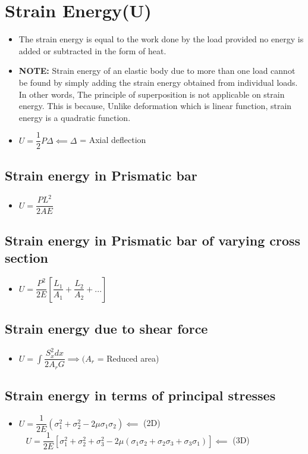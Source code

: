\documentclass[8pt]{report}
\begin{document}
	\section{Strain Energy(U)}
		\begin{itemize}
			\item The strain energy is equal to the work done by the load provided no energy is added or subtracted in the form of heat.
			\item \textbf{NOTE: } Strain energy of an elastic body due to more than one load cannot be found by simply adding the strain energy obtained from individual loads. In other words, The principle of superposition is not applicable on strain energy. This is because, Unlike deformation which is linear function, strain energy is a quadratic function. 
			\item $\boxed{U = \dfrac{1}{2}P\Delta} \impliedby \Delta$ = Axial deflection 
		\end{itemize}\hrulefill
		\subsection{Strain energy in Prismatic bar}
			\begin{itemize}
				\item $\boxed{U = \dfrac{PL^2}{2AE}}$
			\end{itemize}\hrulefill
		\subsection{Strain energy in Prismatic bar of varying cross section}
			\begin{itemize}
				\item $\boxed{U = \dfrac{P^2}{2E}\left[\dfrac{L_1}{A_1}+\dfrac{L_2}{A_2}+...\right]}$
			\end{itemize}\hrulefill
		\subsection{Strain energy due to shear force}
			\begin{itemize}
				\item $\boxed{U = \int\dfrac{S_x^2dx}{2A_rG}}\implies (A_r$ = Reduced area)
			\end{itemize}\hrulefill
		\subsection{Strain energy in terms of principal stresses}
			\begin{itemize}
				\item $\boxed{U = \dfrac{1}{2E}(\sigma_1^2+\sigma_2^2-2\mu\sigma_1\sigma_2)} \impliedby$ (2D) $\;\;\;\boxed{U = \dfrac{1}{2E}\left[\sigma_1^2+\sigma_2^2+\sigma_3^2-2\mu(\sigma_1\sigma_2+\sigma_2\sigma_3+\sigma_3\sigma_1)\right]} \impliedby$ (3D)
			\end{itemize}\hrulefill
\end{document}
